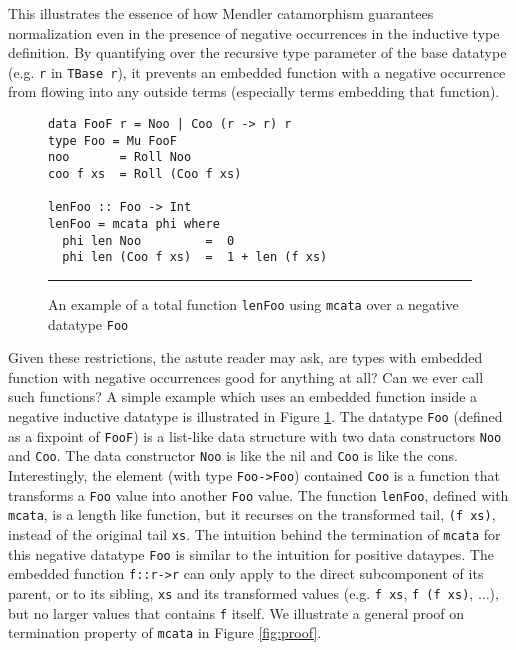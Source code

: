 This illustrates the essence of how Mendler catamorphism guarantees
normalization even in the presence of negative occurrences in the
inductive type definition. By quantifying over the recursive type
parameter of the base datatype (e.g. \verb|r| in \verb|TBase r|), it prevents an
embedded function with a negative occurrence from flowing into any
outside terms (especially terms embedding that function).

\begin{figure}
\begin{verbatim}
data FooF r = Noo | Coo (r -> r) r
type Foo = Mu FooF
noo       = Roll Noo
coo f xs  = Roll (Coo f xs)

lenFoo :: Foo -> Int
lenFoo = mcata phi where
  phi len Noo         =  0
  phi len (Coo f xs)  =  1 + len (f xs)
\end{verbatim}

\caption{An example of a total function \texttt{lenFoo} using \texttt{mcata}
         over a negative datatype \texttt{Foo}}\vspace*{.5em}\hrule
\label{fig:LoopHisto}
\end{figure}

Given these restrictions, the astute reader may ask, are types with
embedded function with negative occurrences good for anything at all?
Can we ever call such functions?  A simple example which uses an
embedded function inside a negative inductive datatype is illustrated
in Figure \ref{fig:LoopHisto}.  The datatype \verb|Foo| (defined as a fixpoint
of \verb|FooF|) is a list-like data structure with two data constructors \verb|Noo|
and \verb|Coo|.  The data constructor \verb|Noo| is like the nil and \verb|Coo| is like
the cons.  Interestingly, the element (with type \verb|Foo->Foo|) contained \verb|Coo|
is a function that transforms a \verb|Foo| value into another \verb|Foo| value.
The function \verb|lenFoo|, defined with \verb|mcata|, is a length like function,
but it recurses on the transformed tail, \verb|(f xs)|,
instead of the original tail \verb|xs|.
The intuition behind the termination of \verb|mcata| for this negative datatype
\verb|Foo| is similar to the intuition for positive dataypes.  The embedded function
\verb|f::r->r| can only apply to the direct subcomponent of its parent, or to its
sibling, \verb|xs| and its transformed values (e.g. \verb|f xs|, \verb|f (f xs)|, $\ldots$),
but no larger values that contains \verb|f| itself.  We illustrate a general proof
on termination property of \verb|mcata| in Figure \ref{fig:proof}.


